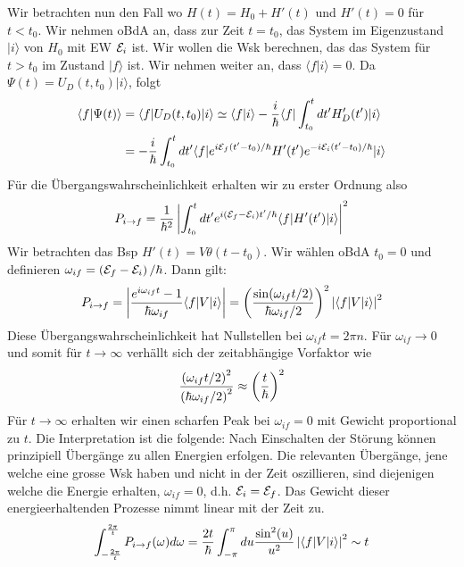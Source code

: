 Wir betrachten nun den Fall wo $H(t) = H_0 + H'(t)$ und $H'(t) = 0$ für
$t < t_0$. Wir nehmen oBdA an, dass zur Zeit $t = t_0$, das System im
Eigenzustand $| i \rangle$ von $H_0$ mit EW $\mathcal{E}_i$ ist. Wir wollen die Wsk
berechnen, das das System für $t>t_0$ im Zustand $|f\rangle$ ist. Wir nehmen
weiter an, dass $\langle f | i \rangle = 0$. Da $\Psi(t) = U_D (t,t_0) |i\rangle$,
folgt
\begin{align*}
    \langle f | \Psi (t) \rangle &=
    \langle f | U_D (t,t_0) | i \rangle
    \simeq \langle f | i \rangle - \frac{i}{\hbar} \langle f | \int_{t_0}^t dt' H_D' (t') | i \rangle
    \\
    &= - \frac{i}{\hbar} \int_{t_0}^t dt' \langle f | e^{i \mathcal{E}_f (t'-t_0) / \hbar} H'(t') e^{-i \mathcal{E}_i (t' - t_0) / \hbar} | i \rangle
\end{align*}
Für die Übergangswahrscheinlichkeit erhalten wir zu erster Ordnung also
\begin{align*}
    P_{i \rightarrow f} = \frac{1}{\hbar^2} \left\vert 
        \int_{t_0}^t dt' e^{i \left( \mathcal{E}_f - \mathcal{E}_i \right) t' / \hbar} \langle f | H'(t') | i \rangle
     \right\vert^2
\end{align*}
Wir betrachten das Bsp $H'(t) = V \theta(t - t_0)$. Wir wählen oBdA $t_0 = 0$ und
definieren $\omega_{if} = \left( \mathcal{E}_f - \mathcal{E}_i \right) / \hbar$. Dann gilt:
\begin{align*}
    P_{i \rightarrow f} = \left\vert \frac{e^{i \omega_{if} t} - 1}{\hbar \omega_{if}} \langle f | V | i \rangle \right\vert
    = \left( \frac{\sin(\omega_{if} t / 2)}{\hbar \omega_{if} / 2} \right)^2 \left\vert \langle f | V | i \rangle \right\vert^2
\end{align*}
Diese Übergangswahrscheinlichkeit hat Nullstellen bei $\omega_{if} t = 2 \pi n$.
Für $\omega_{if} \rightarrow 0$ und somit für $t \rightarrow \infty$ verhällt sich
der zeitabhängige Vorfaktor wie
\begin{align*}
    \frac{\left( \omega_{if} t / 2 \right)^2}{\left( \hbar \omega_{if} / 2 \right)^2}
    \approx \left( \frac{t}{\hbar} \right)^2
\end{align*}
Für $t \rightarrow \infty$ erhalten wir einen scharfen Peak bei $\omega_{if} = 0$
mit Gewicht proportional zu $t$. Die Interpretation ist die folgende: Nach
Einschalten der Störung können prinzipiell Übergänge zu allen Energien erfolgen.
Die relevanten Übergänge, jene welche eine grosse Wsk haben und nicht in der Zeit
oszillieren, sind diejenigen welche die Energie erhalten, $\omega_{if} = 0$,
d.h. $\mathcal{E}_i = \mathcal{E}_f$. Das Gewicht dieser energieerhaltenden Prozesse nimmt linear
mit der Zeit zu.
\begin{align*}
    \int_{- \frac{2 \pi}{t}}^{\frac{2 \pi}{t}} P_{i \rightarrow f} (\omega) d \omega
    = \frac{2 t}{\hbar} \int_{-\pi}^\pi du \frac{\sin^2(u)}{u^2} \left\vert \langle f | V | i \rangle \right\vert^2
    \sim t
\end{align*}

